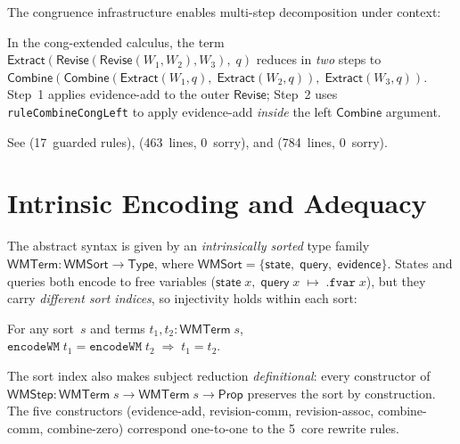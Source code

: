 \documentclass[11pt,openany]{report}
\begin{document}
The congruence infrastructure enables multi-step decomposition under context:

\begin{theorem}
In the cong-extended calculus, the term
$\mathsf{Extract}(\mathsf{Revise}(\mathsf{Revise}(W_1, W_2), W_3),\; q)$
reduces in \emph{two} steps to
$\mathsf{Combine}(\mathsf{Combine}(\mathsf{Extract}(W_1,q),\;
\mathsf{Extract}(W_2,q)),\; \mathsf{Extract}(W_3,q))$.
Step~1 applies evidence-add to the outer $\mathsf{Revise}$;
Step~2 uses \texttt{ruleCombineCongLeft} to apply evidence-add
\emph{inside} the left $\mathsf{Combine}$ argument.
\end{theorem}

\noindent
See 
(17~guarded rules),
(463~lines, 0~sorry), and
(784~lines, 0~sorry).

\section{Intrinsic Encoding and Adequacy}
\label{sec:wm-encoding}

The abstract syntax is given by an \emph{intrinsically sorted} type family
$\mathsf{WMTerm} : \mathsf{WMSort} \to \mathsf{Type}$, where
$\mathsf{WMSort} = \{\mathsf{state},\; \mathsf{query},\;
\mathsf{evidence}\}$.
States and queries both encode to free variables
($\mathsf{state}\;x,\;\mathsf{query}\;x \;\mapsto\; \mathtt{.fvar}\;x$),
but they carry \emph{different sort indices}, so injectivity holds
within each sort:

\begin{theorem}
\label{thm:encode-injective}
For any sort~$s$ and terms $t_1, t_2 : \mathsf{WMTerm}\;s$,\;
$\mathtt{encodeWM}\;t_1 = \mathtt{encodeWM}\;t_2
\;\Rightarrow\; t_1 = t_2$.
\end{theorem}

\noindent
The sort index also makes subject reduction \emph{definitional}: every
constructor of $\mathsf{WMStep} : \mathsf{WMTerm}\;s \to
\mathsf{WMTerm}\;s \to \mathsf{Prop}$ preserves the sort by
construction.  The five constructors (evidence-add, revision-comm,
revision-assoc, combine-comm, combine-zero) correspond one-to-one to
the 5~core rewrite rules.
\end{document}
